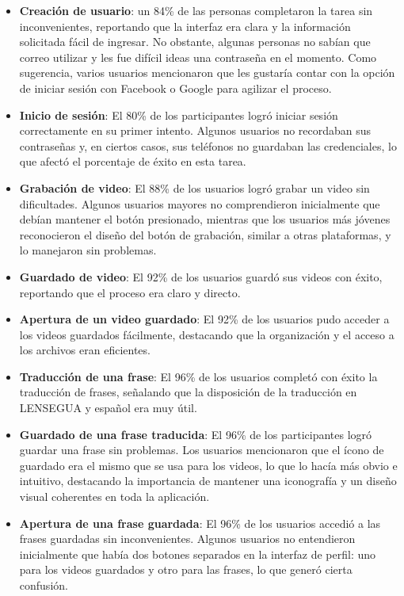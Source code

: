 \begin{itemize}
    \item \textbf{Creación de usuario}: un 84\% de las personas completaron la tarea sin inconvenientes, reportando que la interfaz era clara y la información solicitada fácil de ingresar. No obstante, algunas personas no sabían que correo utilizar y les fue difícil ideas una contraseña en el momento. Como sugerencia, varios usuarios mencionaron que les gustaría contar con la opción de iniciar sesión con Facebook o Google para agilizar el proceso.
    \item \textbf{Inicio de sesión}: El 80\% de los participantes logró iniciar sesión correctamente en su primer intento. Algunos usuarios no recordaban sus contraseñas y, en ciertos casos, sus teléfonos no guardaban las credenciales, lo que afectó el porcentaje de éxito en esta tarea.
    \item \textbf{Grabación de video}: El 88\% de los usuarios logró grabar un video sin dificultades. Algunos usuarios mayores no comprendieron inicialmente que debían mantener el botón presionado, mientras que los usuarios más jóvenes reconocieron el diseño del botón de grabación, similar a otras plataformas, y lo manejaron sin problemas.
    \item \textbf{Guardado de video}: El 92\% de los usuarios guardó sus videos con éxito, reportando que el proceso era claro y directo.
    \item \textbf{Apertura de un video guardado}: El 92\% de los usuarios pudo acceder a los videos guardados fácilmente, destacando que la organización y el acceso a los archivos eran eficientes.
    \item \textbf{Traducción de una frase}: El 96\% de los usuarios completó con éxito la traducción de frases, señalando que la disposición de la traducción en LENSEGUA y español era muy útil.
    \item \textbf{Guardado de una frase traducida}: El 96\% de los participantes logró guardar una frase sin problemas. Los usuarios mencionaron que el ícono de guardado era el mismo que se usa para los videos, lo que lo hacía más obvio e intuitivo, destacando la importancia de mantener una iconografía y un diseño visual coherentes en toda la aplicación.
    \item \textbf{Apertura de una frase guardada}: El 96\% de los usuarios accedió a las frases guardadas sin inconvenientes. Algunos usuarios no entendieron inicialmente que había dos botones separados en la interfaz de perfil: uno para los videos guardados y otro para las frases, lo que generó cierta confusión.

\end{itemize}
